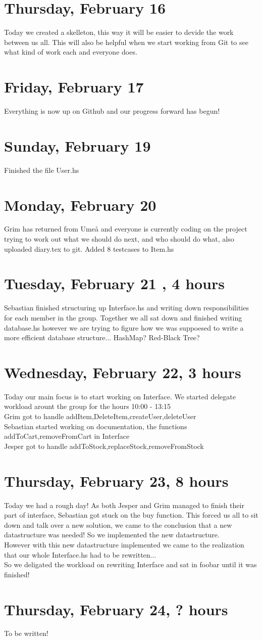 \documentclass[11pt]{article}
\begin{document}
\section*{Thursday, February 16}
Today we created a skelleton, this way it will be easier to devide the work between us all. This will also be helpful when we start working from Git to see what kind of work each and everyone does.

\section*{Friday, February 17}
Everything is now up on Github and our progress forward has begun!
\section*{Sunday, February 19}
Finished the file User.hs
\section*{Monday, February 20}
Grim has returned from Umeå and everyone is currently coding on the project trying to work out what we should do next, and who should do what, also uploaded diary.tex to git. Added 8 testcases to Item.hs
\section*{Tuesday, February 21 , 4 hours }
Sebastian finished structuring up Interface.hs and writing down responsibilities for each member in the group.
Together we all sat down and finished writing database.hs however we are trying to figure how we was suppoesed to write a more efficient database structure... HashMap? Red-Black Tree?
\section*{Wednesday, February 22, 3 hours }
Today our main focus is to start working on Interface. We started delegate workload arount the group for the hours 10:00 - 13:15 \\
Grim got to handle addItem,DeleteItem,createUser,deleteUser \\
Sebastian started working on documentation, the functions addToCart,removeFromCart in Interface \\
Jesper got to handle addToStock,replaceStock,removeFromStock \\
\section*{Thursday, February 23, 8 hours}
Today we had a rough day! As both Jesper and Grim managed to finish their part of interface, Sebastian got stuck on the buy function.
This forced us all to sit down and talk over a new solution, we came to the conclusion that a new datastructure was needed! So we implemented the new datastructure. \\
However with this new datastructure implemented we came to the realization that our whole Interface.hs had to be rewritten...\\
So we deligated the workload on rewriting Interface and sat in foobar until it was finished!
\section*{Thursday, February 24, ? hours}
To be written!
\end{document}
